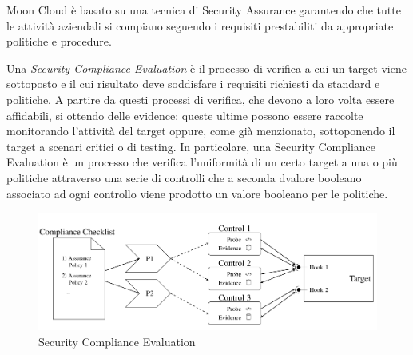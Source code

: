 Moon Cloud è basato su una tecnica di Security Assurance garantendo che tutte le attività aziendali si compiano seguendo i requisiti 
prestabiliti da appropriate politiche e procedure.

Una \textit{Security Compliance Evaluation} è il processo di verifica a cui un target viene sottoposto e il cui risultato deve 
soddisfare i requisiti richiesti da standard e politiche. A partire da questi processi di verifica, che devono a loro volta essere 
affidabili, si ottendo delle evidence; queste ultime possono essere raccolte monitorando l'attività del target oppure, come già 
menzionato, sottoponendo il target a scenari critici o di testing.
In particolare, una Security Compliance Evaluation è un processo che verifica l'uniformità di un certo target a una o più politiche 
attraverso una serie di controlli che a seconda dvalore booleano associato ad ogni controllo viene prodotto un valore booleano 
per le politiche.
\begin{figure}
	\includegraphics[scale=0.5]{images/Security_Compliance_Evaluation.PNG}
	\caption{Security Compliance Evaluation}
	\label{fig:Security_Compliance_Evaluation}
\end{figure}

\newpage

